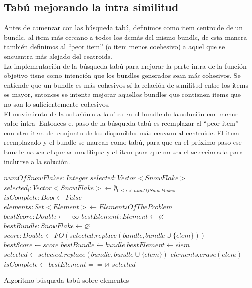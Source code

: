 \subsection{Tabú mejorando la intra similitud}
Antes de comenzar con las búsqueda tabú, definimos como item centroide de un bundle, al item más cercano a todos los demás del mismo bundle, de esta manera también definimos al ``peor item'' (o item menos coehesivo) a aquel que se encuentra más alejado del centroide.\\
La implementación de la búsqueda tabú para mejorar la parte intra de la función objetivo tiene como intención que los bundles generados sean más cohesivos. Se entiende que un bundle es más cohesivos sí la relación de similitud entre los items es mayor, entonces se intenta mejorar aquellos bundles que contienen items que no son lo suficientemente cohesivos.\\
El movimiento de la solución s a la s' es en el bundle de la solución con menor valor intra. Entonces el paso de la búsqueda tabú es reemplazar el ``peor item'' con otro item del conjunto de los disponibles más cercano al centroide. El item reemplazado y el bundle se marcan como tabú, para que en el próximo paso ese bundle no sea el que se modifique y el item para que no sea el seleccionado para incluirse a la solución.
\begin{algorithm}[H]
\begin{algorithmic}[1]
\REQUIRE $numOfSnowFlakes:Integer$
\ENSURE $selected:Vector<SnowFlake>$
\STATE $selected_{i}:Vector<SnowFlake> \leftarrow \emptyset_{0\leq i<numOfSnowFlakes}$
\STATE $isComplete:Bool \leftarrow False$
\STATE $elements:Set<Element> \leftarrow ElementsOfTheProblem$
  \STATE $bestScore:Double \leftarrow -\infty$
  \STATE $bestElement:Element \leftarrow \varnothing$
  \STATE $bestBundle:SnowFlake \leftarrow \varnothing$
        \STATE $score:Double \leftarrow FO(selected.replace(bundle, bundle \cup \{elem\}))$
          \STATE $bestScore \leftarrow score$
          \STATE $bestBundle \leftarrow bundle$
          \STATE $bestElement \leftarrow elem$
        \ENDIF
      \ENDIF
    \ENDFOR
  \ENDFOR
  \STATE $selected \leftarrow selected.replace(bundle, bundle \cup \{elem\})$
  \STATE $elements.erase(elem)$
  \STATE $isComplete \leftarrow bestElement == \varnothing$
\ENDWHILE
\RETURN $selected$
\end{algorithmic}
\caption{Algoritmo búsqueda tabú sobre elementos}\label{alg:algBusTabuIntra}
\end{algorithm}
